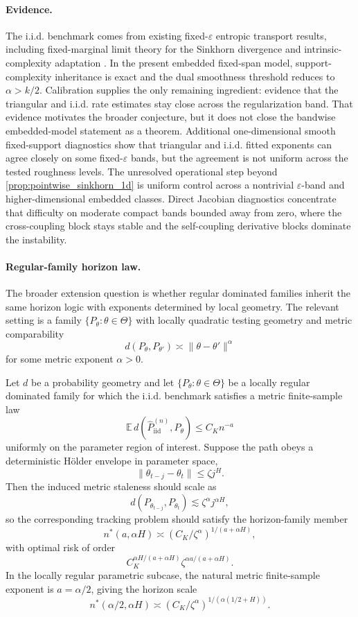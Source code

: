 \paragraph{Evidence.}
The i.i.d. benchmark comes from existing fixed-$\varepsilon$ entropic transport
results, including fixed-marginal limit theory for the Sinkhorn divergence and
intrinsic-complexity adaptation \citep{GoldfeldEtAl2022,Stromme2023MID,
GroppeHundrieser2024LCA}. In the present embedded fixed-span model,
support-complexity inheritance is exact and the dual smoothness threshold
reduces to $\alpha>k/2$. Calibration supplies the only remaining ingredient:
evidence that the triangular and i.i.d. rate estimates stay close across the
regularization band. That evidence motivates the broader conjecture, but it does
not close the bandwise embedded-model statement as a theorem. Additional
one-dimensional smooth fixed-support diagnostics show that triangular and i.i.d.
fitted exponents can agree closely on some fixed-$\varepsilon$ bands, but the
agreement is not uniform across the tested roughness levels. The unresolved
operational step beyond \cref{prop:pointwise_sinkhorn_1d} is uniform control
across a nontrivial $\varepsilon$-band and higher-dimensional embedded classes.
Direct Jacobian diagnostics concentrate that difficulty on moderate compact
bands bounded away from zero, where the cross-coupling block stays stable and
the self-coupling derivative blocks dominate the instability.

\paragraph{Regular-family horizon law.}
The broader extension question is whether regular dominated families inherit the
same horizon logic with exponents determined by local geometry. The relevant
setting is a family $\{P_\theta: \theta\in\Theta\}$ with locally quadratic
testing geometry and metric comparability
\[
  d(P_\theta,P_{\theta'})\asymp \|\theta-\theta'\|^{\alpha}
\]
for some metric exponent $\alpha>0$.

\begin{conjecture}
\label{conj:regular_family_horizon_law}
Let $d$ be a probability geometry and let $\{P_\theta: \theta\in\Theta\}$ be a
locally regular dominated family for which the i.i.d. benchmark satisfies a
 metric finite-sample law
\[
  \mathbb E\,d\!\left(\widehat P_{\mathrm{iid}}^{(n)},P_\theta\right)
  \le C_K n^{-a}
\]
uniformly on the parameter region of interest. Suppose the path obeys a
deterministic H\"older envelope in parameter space,
\[
  \|\theta_{t-j}-\theta_t\|\le \zeta j^H.
\]
Then the induced metric staleness should scale as
\[
  d(P_{\theta_{t-j}},P_{\theta_t})\lesssim \zeta^{\alpha}j^{\alpha H},
\]
so the corresponding tracking problem should satisfy the horizon-family member
\[
  n^*(a,\alpha H)\asymp (C_K/\zeta^{\alpha})^{1/(a+\alpha H)},
\]
with optimal risk of order
\[
  C_K^{\alpha H/(a+\alpha H)}\zeta^{\alpha a/(a+\alpha H)}.
\]
In the locally regular parametric subcase, the natural metric finite-sample exponent is
$a=\alpha/2$, giving the horizon scale
\[
  n^*(\alpha/2,\alpha H)
  \asymp (C_K/\zeta^{\alpha})^{1/(\alpha(1/2+H))}.
\]
\end{conjecture}

